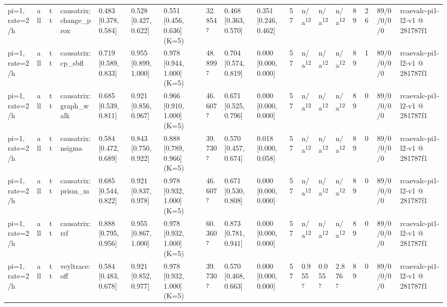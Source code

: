 \begin{table}[t]
\begin{tabular}{llllllllllllllllll}
pi=1, rate=2/h & all & tt & causatrix:change\_prox & 0.483 [0.378, 0.584] & 0.528 [0.427, 0.622] & 0.551 [0.456, 0.636] (K=5) & 32.854\textsuperscript{7} & 0.468 [0.363, 0.570] & 0.351 [0.246, 0.462] & 57 & n/a\textsuperscript{12} & n/a\textsuperscript{12} & n/a\textsuperscript{12} & 89 & 26 & 89/0/0/0/0 & rcaevalc-pi1-l2-v1 @ 281787f1 \\
pi=1, rate=2/h & all & tt & causatrix:cp\_sbfl & 0.719 [0.589, 0.833] & 0.955 [0.899, 1.000] & 0.978 [0.944, 1.000] (K=5) & 48.899\textsuperscript{7} & 0.704 [0.574, 0.819] & 0.000 [0.000, 0.000] & 57 & n/a\textsuperscript{12} & n/a\textsuperscript{12} & n/a\textsuperscript{12} & 89 & 1 & 89/0/0/0/0 & rcaevalc-pi1-l2-v1 @ 281787f1 \\
pi=1, rate=2/h & all & tt & causatrix:graph\_walk & 0.685 [0.539, 0.811] & 0.921 [0.856, 0.967] & 0.966 [0.910, 1.000] (K=5) & 46.607\textsuperscript{7} & 0.671 [0.525, 0.796] & 0.000 [0.000, 0.000] & 57 & n/a\textsuperscript{12} & n/a\textsuperscript{12} & n/a\textsuperscript{12} & 89 & 0 & 89/0/0/0/0 & rcaevalc-pi1-l2-v1 @ 281787f1 \\
pi=1, rate=2/h & all & tt & causatrix:nsigma & 0.584 [0.472, 0.689] & 0.843 [0.750, 0.922] & 0.888 [0.789, 0.966] (K=5) & 39.730\textsuperscript{7} & 0.570 [0.457, 0.674] & 0.018 [0.000, 0.058] & 57 & n/a\textsuperscript{12} & n/a\textsuperscript{12} & n/a\textsuperscript{12} & 89 & 0 & 89/0/0/0/0 & rcaevalc-pi1-l2-v1 @ 281787f1 \\
pi=1, rate=2/h & all & tt & causatrix:prism\_m & 0.685 [0.544, 0.822] & 0.921 [0.837, 0.978] & 0.978 [0.932, 1.000] (K=5) & 46.607\textsuperscript{7} & 0.671 [0.530, 0.808] & 0.000 [0.000, 0.000] & 57 & n/a\textsuperscript{12} & n/a\textsuperscript{12} & n/a\textsuperscript{12} & 89 & 0 & 89/0/0/0/0 & rcaevalc-pi1-l2-v1 @ 281787f1 \\
pi=1, rate=2/h & all & tt & causatrix:rrf & 0.888 [0.795, 0.956] & 0.955 [0.867, 1.000] & 0.978 [0.932, 1.000] (K=5) & 60.360\textsuperscript{7} & 0.873 [0.781, 0.941] & 0.000 [0.000, 0.000] & 57 & n/a\textsuperscript{12} & n/a\textsuperscript{12} & n/a\textsuperscript{12} & 89 & 0 & 89/0/0/0/0 & rcaevalc-pi1-l2-v1 @ 281787f1 \\
pi=1, rate=2/h & all & tt & veyltrace:off & 0.584 [0.483, 0.678] & 0.921 [0.852, 0.977] & 0.978 [0.932, 1.000] (K=5) & 39.730\textsuperscript{7} & 0.570 [0.468, 0.663] & 0.000 [0.000, 0.000] & 57 & 0.955\textsuperscript{7} & 0.055\textsuperscript{7} & 2.876\textsuperscript{7} & 89 & 0 & 89/0/0/0/0 & rcaevalc-pi1-l2-v1 @ 281787f1 \\

\end{tabular}
\end{table}
